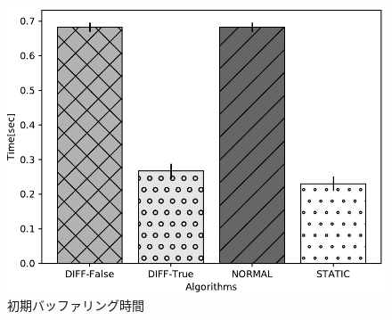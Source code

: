\documentclass[a4j,12pt]{gradthesis_utf8}
\begin{document}
\begin{figure}[h]
	\centering
	\includegraphics[width=13.5cm]{figure/InitialBufferingTimeTB.pdf}
	\caption{初期バッファリング時間}
	\label{ibt}
\end{figure}
\end{document}
